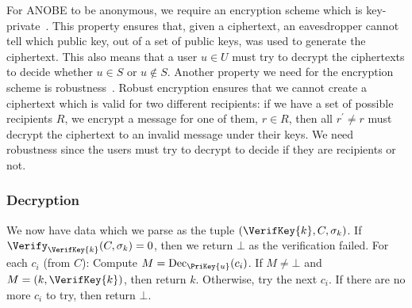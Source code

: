 For \ac{ANOBE} to be anonymous, we require an encryption scheme which is 
key-private~\cite{KeyPrivacy}.
This property ensures that, given a ciphertext, an eavesdropper cannot tell 
which public key, out of a set of public keys, was used to generate the 
ciphertext.
This also means that a user \(u\in U\) must try to decrypt the ciphertexts to 
decide whether \(u\in S\) or \(u\notin S\).
Another property we need for the encryption scheme is 
robustness~\cite{RobustEncryption}.
Robust encryption ensures that we cannot create a ciphertext which is valid for 
two different recipients:
if we have a set of possible recipients \(R\), we encrypt a message for one of 
them, \(r\in R\), then all \(r^\prime\neq r\) must decrypt the ciphertext to an 
invalid message under their keys.
We need robustness since the users must try to decrypt to decide if they are 
recipients or not.

\subsubsection<article>{Decryption}

We now have data which we parse as the tuple \((\VerifKey{k}, C, \sigma_k)\).
If \(\Verify_{\VerifKey{k}}( C, \sigma_k ) = 0\), then we return \(\bot\) as 
the verification failed.
For each \(c_i\) (from \(C\)):
Compute \(M = \Dec_{\PriKey{u}}( c_i )\).
If \(M \neq \bot\) and \(M = (k, \VerifKey{k})\), then return \(k\).
Otherwise, try the next \(c_i\).
If there are no more \(c_i\) to try, then return \(\bot\).

\begin{frame}
  \begin{figure}
    \begin{algorithmic}[1]
        \pause{}

          \State{%
            \Return{$\bot$}
          }
        \EndIf{}

        \pause{}

            \State{\Return{$\bot$}}
          \EndIf{}
        \EndFor{}
        \State{\Return{$\bot$}}
      \EndFunction{}
    \end{algorithmic}
  \end{figure}
\end{frame}

